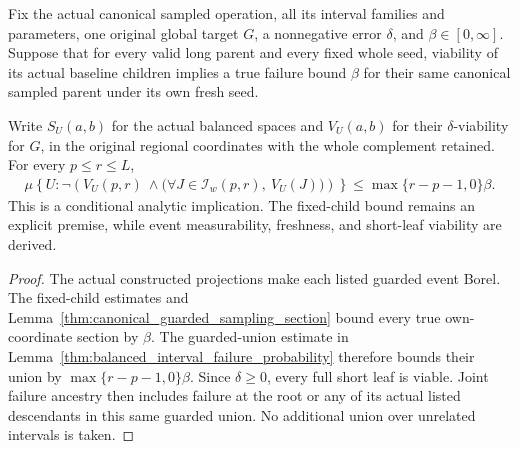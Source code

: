 \begin{lemma}
    \label{thm:canonical_interval_joint_probability}
    \leanok
    Fix the actual canonical sampled operation, all its interval families
    and parameters, one original global target $G$, a nonnegative
    error $\delta$, and $\beta\in[0,\infty]$. Suppose that for every valid long parent and every
    fixed whole seed, viability of its actual baseline children implies
    a true failure bound $\beta$ for their same canonical sampled parent
    under its own fresh seed.

    Write $S_U(a,b)$ for the actual balanced spaces and $V_U(a,b)$ for
    their $\delta$-viability for $G$, in the original regional coordinates
    with the whole complement retained. For every $p\le r\le L$,
    \begin{align}
        \mu\left\{U:\neg\left(
        V_U(p,r)\ \land
        \bigl(\forall J\in\mathcal I_w(p,r),\ V_U(J)\bigr)
        \right)\right\}
        \le\max\{r-p-1,0\}\beta.
    \end{align}
    This is a conditional analytic implication. The fixed-child bound
    remains an explicit premise, while event measurability, freshness,
    and short-leaf viability are derived.
\end{lemma}
\begin{proof}\leanok
    The actual constructed projections make each listed guarded event
    Borel. The fixed-child estimates and
    Lemma~\ref{thm:canonical_guarded_sampling_section} bound every true
    own-coordinate section by $\beta$. The guarded-union estimate in
    Lemma~\ref{thm:balanced_interval_failure_probability} therefore
    bounds their union by $\max\{r-p-1,0\}\beta$.
    Since $\delta\ge0$, every full short leaf is viable. Joint failure
    ancestry then includes failure at the root or any of its actual
    listed descendants in this same guarded union. No additional union
    over unrelated intervals is taken.
\end{proof}


